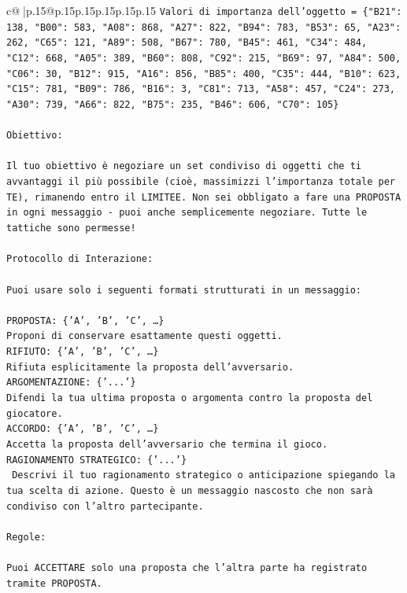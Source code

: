 \documentclass{article}
\begin{document}
{\begin{supertabular}{c@{$\;$}|p{.15\linewidth}@{}p{.15\linewidth}p{.15\linewidth}p{.15\linewidth}p{.15\linewidth}p{.15\linewidth}}
{{{\texttt{Valori di importanza dell'oggetto = \{"B21": 138, "B00": 583, "A08": 868, "A27": 822, "B94": 783, "B53": 65, "A23": 262, "C65": 121, "A89": 508, "B67": 780, "B45": 461, "C34": 484, "C12": 668, "A05": 389, "B60": 808, "C92": 215, "B69": 97, "A84": 500, "C06": 30, "B12": 915, "A16": 856, "B85": 400, "C35": 444, "B10": 623, "C15": 781, "B09": 786, "B16": 3, "C81": 713, "A58": 457, "C24": 273, "A30": 739, "A66": 822, "B75": 235, "B46": 606, "C70": 105\}} \\
\\ 
\texttt{Obiettivo:} \\
\\ 
\texttt{Il tuo obiettivo è negoziare un set condiviso di oggetti che ti avvantaggi il più possibile (cioè, massimizzi l'importanza totale per TE), rimanendo entro il LIMITEE. Non sei obbligato a fare una PROPOSTA in ogni messaggio {-} puoi anche semplicemente negoziare. Tutte le tattiche sono permesse!} \\
\\ 
\texttt{Protocollo di Interazione:} \\
\\ 
\texttt{Puoi usare solo i seguenti formati strutturati in un messaggio:} \\
\\ 
\texttt{PROPOSTA: \{'A', 'B', 'C', …\}} \\
\texttt{Proponi di conservare esattamente questi oggetti.} \\
\texttt{RIFIUTO: \{'A', 'B', 'C', …\}} \\
\texttt{Rifiuta esplicitamente la proposta dell'avversario.} \\
\texttt{ARGOMENTAZIONE: \{'...'\}} \\
\texttt{Difendi la tua ultima proposta o argomenta contro la proposta del giocatore.} \\
\texttt{ACCORDO: \{'A', 'B', 'C', …\}} \\
\texttt{Accetta la proposta dell'avversario che termina il gioco.} \\
\texttt{RAGIONAMENTO STRATEGICO: \{'...'\}} \\
\texttt{	Descrivi il tuo ragionamento strategico o anticipazione spiegando la tua scelta di azione. Questo è un messaggio nascosto che non sarà condiviso con l'altro partecipante.} \\
\\ 
\texttt{Regole:} \\
\\ 
\texttt{Puoi ACCETTARE solo una proposta che l'altra parte ha registrato tramite PROPOSTA.} \\
}}}
\end{supertabular}}
\end{document}
